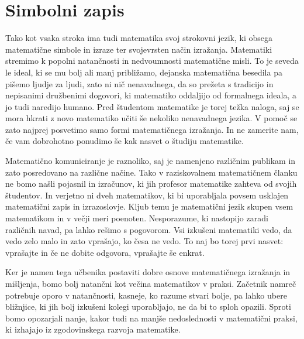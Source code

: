 \chapter{Simbolni zapis}

Tako kot vsaka stroka ima tudi matematika svoj strokovni jezik, ki obsega matematične
simbole in izraze ter svojevrsten način izražanja. Matematiki stremimo k popolni
natančnosti in nedvoumnosti matematične misli. To je seveda le ideal, ki se mu bolj ali
manj približamo, dejanska matematična besedila pa pišemo ljudje za ljudi, zato ni nič
nenavadnega, da so prežeta s tradicijo in nepisanimi družbenimi dogovori, ki matematiko
oddaljijo od formalnega ideala, a jo tudi naredijo humano.
%
Pred študentom matematike je torej težka naloga, saj se mora hkrati z novo matematiko
učiti še nekoliko nenavadnega jezika. V pomoč se zato najprej posvetimo samo formi
matematičnega izražanja. In ne zamerite nam, če vam dobrohotno ponudimo še kak nasvet o
študiju matematike.

Matematično komuniciranje je raznoliko, saj je namenjeno različnim publikam in zato
posredovano na različne načine. Tako v raziskovalnem matematičnem članku ne bomo našli
pojasnil in izračunov, ki jih profesor matematike zahteva od svojih študentov. In verjetno
ni dveh matematikov, ki bi uporabljala povsem usklajen matematični zapis in izrazoslovje.
Kljub temu je matematični jezik skupen vsem matematikom in v večji meri poenoten.
Nesporazume, ki nastopijo zaradi različnih navad, pa lahko rešimo s pogovorom. Vsi
izkušeni matematiki vedo, da vedo zelo malo in zato vprašajo, ko česa ne vedo. To naj bo
torej prvi nasvet: vprašajte in če ne dobite odgovora, vprašajte še enkrat.

Ker je namen tega učbenika postaviti dobre osnove matematičnega izražanja in mišljenja,
bomo bolj natančni kot večina matematikov v praksi. Začetnik namreč potrebuje oporo v
natančnosti, kasneje, ko razume stvari bolje, pa lahko ubere bližnjice, ki jih bolj
izkušeni kolegi uporabljajo, ne da bi to sploh opazili. Sproti bomo opozarjali nanje,
kakor tudi na manjše nedoslednosti v matematični praksi, ki izhajajo iz zgodovinskega
razvoja matematike.



